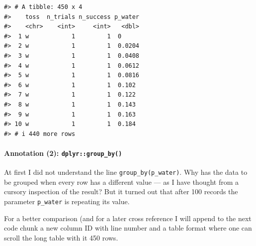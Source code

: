 \documentclass[
  letterpaper,
  DIV=11,
  numbers=noendperiod]{scrreprt}
\let\oldparagraph\paragraph
\renewcommand{\paragraph}[1]{\oldparagraph{#1}\mbox{}}
\begin{document}
\begin{verbatim}
#> # A tibble: 450 x 4
#>    toss  n_trials n_success p_water
#>    <chr>    <int>     <int>   <dbl>
#>  1 w            1         1  0     
#>  2 w            1         1  0.0204
#>  3 w            1         1  0.0408
#>  4 w            1         1  0.0612
#>  5 w            1         1  0.0816
#>  6 w            1         1  0.102 
#>  7 w            1         1  0.122 
#>  8 w            1         1  0.143 
#>  9 w            1         1  0.163 
#> 10 w            1         1  0.184 
#> # i 440 more rows
\end{verbatim}

\hypertarget{sec-annotation-2-group_by}{%
\paragraph{\texorpdfstring{Annotation (2):
\texttt{dplyr::group\_by()}}{Annotation (2): dplyr::group\_by()}}\label{sec-annotation-2-group_by}}

At first I did not understand the line \texttt{group\_by(p\_water)}. Why
has the data to be grouped when every row has a different value --- as I
have thought from a cursory inspection of the result? But it turned out
that after 100 records the parameter \texttt{p\_water} is repeating its
value.

\begin{tcolorbox}[enhanced jigsaw, colframe=quarto-callout-tip-color-frame, colback=white, toprule=.15mm, breakable, arc=.35mm, bottomtitle=1mm, colbacktitle=quarto-callout-tip-color!10!white, toptitle=1mm, titlerule=0mm, title=\textcolor{quarto-callout-tip-color}{\faLightbulb}\hspace{0.5em}{Special table format}, leftrule=.75mm, opacityback=0, rightrule=.15mm, opacitybacktitle=0.6, bottomrule=.15mm, left=2mm, coltitle=black]

For a better comparison (and for a later cross reference I will append
to the next code chunk a new column ID with line number and a table
format where one can scroll the long table with it 450 rows.

\end{tcolorbox}
\end{document}
